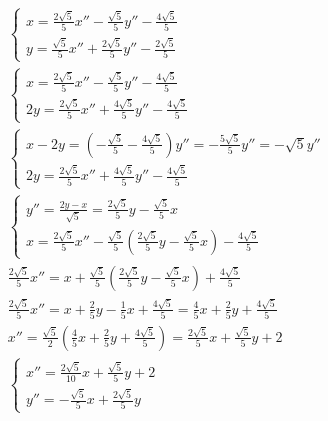 \documentclass[12pt, a4paper]{article}
\begin{document}
    \begin{gather}
        \begin{cases}
            x = \frac{2 \sqrt{5}}{5} x'' - \frac{\sqrt{5}}{5} y'' - \frac{4 \sqrt{5}}{5} \\
            y = \frac{\sqrt{5}}{5} x'' + \frac{2 \sqrt{5}}{5} y'' - \frac{2 \sqrt{5}}{5}
        \end{cases} \\
        \begin{cases}
            x = \frac{2 \sqrt{5}}{5} x'' - \frac{\sqrt{5}}{5} y'' - \frac{4 \sqrt{5}}{5} \\
            2y = \frac{2\sqrt{5}}{5} x'' + \frac{4 \sqrt{5}}{5} y'' - \frac{4 \sqrt{5}}{5}
        \end{cases} \\
        \begin{cases}
            x - 2y = (- \frac{\sqrt{5}}{5} - \frac{4 \sqrt{5}}{5} ) y'' = -\frac{5\sqrt{5}}{5} y'' = -\sqrt{5} y'' \\
            2y = \frac{2\sqrt{5}}{5} x'' + \frac{4 \sqrt{5}}{5} y'' - \frac{4 \sqrt{5}}{5}
        \end{cases} \\
        \begin{cases}
            y'' = \frac{2y - x}{\sqrt{5}} = \frac{2 \sqrt{5}}{5} y - \frac{\sqrt{5}}{5} x \\
            x = \frac{2 \sqrt{5}}{5} x'' - \frac{\sqrt{5}}{5} (\frac{2 \sqrt{5}}{5} y - \frac{\sqrt{5}}{5} x) - \frac{4 \sqrt{5}}{5}
        \end{cases} \\
        \frac{2 \sqrt{5}}{5} x'' = x + \frac{\sqrt{5}}{5} \left(\frac{2 \sqrt{5}}{5} y - \frac{\sqrt{5}}{5} x \right) + \frac{4 \sqrt{5}}{5} \\
        \frac{2 \sqrt{5}}{5} x'' = x + \frac{2}{5} y - \frac{1}{5} x + \frac{4 \sqrt{5}}{5} = \frac{4}{5} x + \frac{2}{5} y + \frac{4 \sqrt{5}}{5} \\
        x'' = \frac{\sqrt{5}}{2} \left( \frac{4}{5} x + \frac{2}{5} y + \frac{4 \sqrt{5}}{5} \right) = \frac{2 \sqrt{5}}{5} x + \frac{\sqrt{5}}{5} y + 2 \\
        \begin{cases}
            x'' = \frac{2 \sqrt{5}}{10} x + \frac{\sqrt{5}}{5} y + 2 \\
            y'' = - \frac{\sqrt{5}}{5} x + \frac{2 \sqrt{5}}{5} y
        \end{cases}
    \end{gather}
\end{document}
